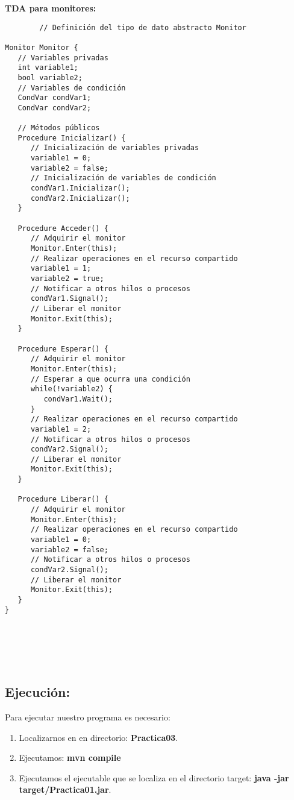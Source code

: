 \documentclass[12pt]{article}
\begin{document}
\begin{enumerate}
    \textbf{TDA para monitores:}\\
    \begin{verbatim}
        // Definición del tipo de dato abstracto Monitor

Monitor Monitor {
   // Variables privadas
   int variable1;
   bool variable2;
   // Variables de condición
   CondVar condVar1;
   CondVar condVar2;
   
   // Métodos públicos
   Procedure Inicializar() {
      // Inicialización de variables privadas
      variable1 = 0;
      variable2 = false;
      // Inicialización de variables de condición
      condVar1.Inicializar();
      condVar2.Inicializar();
   }
   
   Procedure Acceder() {
      // Adquirir el monitor
      Monitor.Enter(this);
      // Realizar operaciones en el recurso compartido
      variable1 = 1;
      variable2 = true;
      // Notificar a otros hilos o procesos
      condVar1.Signal();
      // Liberar el monitor
      Monitor.Exit(this);
   }
   
   Procedure Esperar() {
      // Adquirir el monitor
      Monitor.Enter(this);
      // Esperar a que ocurra una condición
      while(!variable2) {
         condVar1.Wait();
      }
      // Realizar operaciones en el recurso compartido
      variable1 = 2;
      // Notificar a otros hilos o procesos
      condVar2.Signal();
      // Liberar el monitor
      Monitor.Exit(this);
   }
   
   Procedure Liberar() {
      // Adquirir el monitor
      Monitor.Enter(this);
      // Realizar operaciones en el recurso compartido
      variable1 = 0;
      variable2 = false;
      // Notificar a otros hilos o procesos
      condVar2.Signal();
      // Liberar el monitor
      Monitor.Exit(this);
   }
}


    
    \end{verbatim}\\
\end{enumerate}

{\color{blue} \subsection*{\textbf{Ejecución:}}}

Para ejecutar nuestro programa es necesario:\\

\begin{enumerate}
    \item Localizarnos en en directorio: \textbf{Practica03}.
    \item Ejecutamos: \textbf{mvn compile}
    \item Ejecutamos el ejecutable que se localiza en el directorio target: \textbf{java -jar target/Practica01.jar}. 
\end{enumerate}
\end{document}
